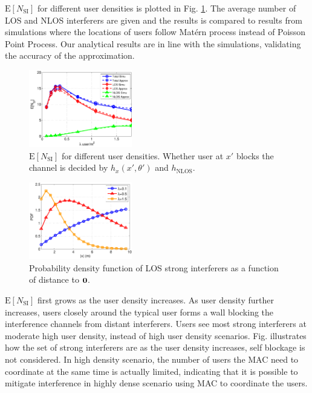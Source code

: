 \documentclass[10pt, conference, letterpaper]{IEEEtran}
\newcommand*{\Rom}[1]{\uppercase\expandafter{\romannumeral #1\relax}} %
\begin{document}
$\mathrm{E}[N_{\mathrm{SI}}]$ for different user densities is plotted in Fig. \ref{fig:Channel_en_si}. The average number of LOS and NLOS interferers are given and the results is compared to results from simulations where the locations of users follow Mat\'ern \Rom{3} process \cite{matern} instead of Poisson Point Process. Our analytical results are in line with the simulations, validating the accuracy of the approximation.

\begin{figure}
	\centering
	\includegraphics[width = 0.4\textwidth]{Channel_en_si.pdf}
	\caption{$\mathrm{E}[N_{\mathrm{SI}}]$ for different user densities. Whether user at $x'$ blocks the channel is decided by $h_x(x',\theta')$ and $h_{\mathrm{NLOS}}$.}
	\label{fig:Channel_en_si}
\end{figure}


\begin{figure}
	\centering
	\includegraphics[width = 0.4\textwidth]{Channel_si_pdf.pdf}
	\caption{Probability density function of LOS strong interferers as a function of distance to $\bf{0}$.}
	\label{fig:Channel_si_pdf}
\end{figure}

$\mathrm{E}[N_{\mathrm{SI}}]$ first grows as the user density increases. As user density further increases, users closely around the typical user forms a wall blocking the interference channels from distant interferers. Users see most strong interferers at moderate high user density, instead of high user density scenarios. Fig.  illustrates how the set of strong interferers are as the user density increases, self blockage is not considered. In high density scenario, the number of users the MAC need to coordinate at the same time is actually limited, indicating that it is possible to mitigate interference in highly dense scenario using MAC to coordinate the users.
\end{document}
